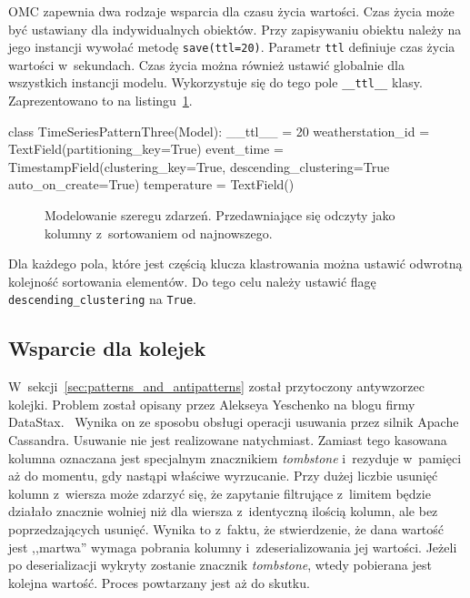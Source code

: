 OMC zapewnia dwa rodzaje wsparcia dla czasu życia wartości. Czas życia może być ustawiany dla indywidualnych obiektów. Przy zapisywaniu obiektu należy na jego instancji wywołać metodę \verb+save(ttl=20)+. Parametr \verb+ttl+ definiuje czas życia wartości w~sekundach. Czas życia można również ustawić globalnie dla wszystkich instancji modelu. Wykorzystuje się do tego pole \verb+__ttl__+ klasy. Zaprezentowano to na listingu~\ref{lst:time_series_modeling_three}.

\begin{verbbox}
class TimeSeriesPatternThree(Model):
    __ttl__ = 20
    weatherstation_id = TextField(partitioning_key=True)
    event_time = TimestampField(clustering_key=True, 
                                descending_clustering=True
                                auto_on_create=True)
    temperature = TextField()
\end{verbbox}

\begin{figure}[ht!]
	\centering
	\theverbbox
	\caption{Modelowanie szeregu zdarzeń. Przedawniające się odczyty jako kolumny z~sortowaniem od najnowszego.}
	\label{lst:time_series_modeling_three}
\end{figure} 

Dla każdego pola, które jest częścią klucza klastrowania można ustawić odwrotną kolejność sortowania elementów. Do tego celu należy ustawić flagę \verb+descending_clustering+ na \verb+True+.

\subsection{Wsparcie dla kolejek}

W~sekcji~\ref{sec:patterns_and_antipatterns} został przytoczony antywzorzec kolejki. Problem został opisany przez Alekseya Yeschenko na blogu firmy DataStax.~\cite{cassandra_queue_antipattern} Wynika on ze sposobu obsługi operacji usuwania przez silnik Apache Cassandra. Usuwanie nie jest realizowane natychmiast. Zamiast tego kasowana kolumna oznaczana jest specjalnym znacznikiem \emph{tombstone} i~rezyduje w~pamięci aż do momentu, gdy nastąpi właściwe wyrzucanie. Przy dużej liczbie usunięć kolumn z~wiersza może zdarzyć się, że zapytanie filtrujące z~limitem będzie działało znacznie wolniej niż dla wiersza z~identyczną ilością kolumn, ale bez poprzedzających usunięć. Wynika to z~faktu, że stwierdzenie, że dana wartość jest ,,martwa'' wymaga pobrania kolumny i~zdeserializowania jej wartości. Jeżeli po deserializacji wykryty zostanie znacznik \emph{tombstone}, wtedy pobierana jest kolejna wartość. Proces powtarzany jest aż do skutku.

